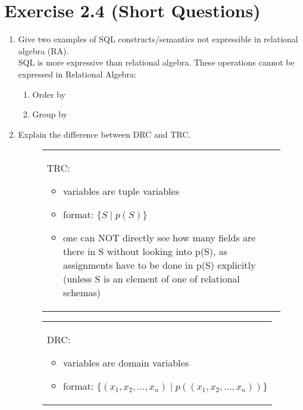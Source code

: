 \documentclass[10pt]{article}
\begin{document}
		\clearpage
		
		\section*{Exercise 2.4 (Short Questions)}
		
		\begin{enumerate}
			\item Give two examples of SQL constructs/semantics not expressible in relational algebra (RA).\\
			SQL is more expressive than relational algebra. These operations cannot be expressed in Relational Algebra:
			\begin{enumerate}
				\item Order by
				\item Group by
			\end{enumerate}
		
			\item Explain the difference between DRC and TRC.
			
			\begin{figure}[!htb]
				\centering
				\begin{minipage}{0.5\textwidth}
					\begin{tabular}{p{}}
						TRC:
						
						\begin{itemize}
							
							\item variables are tuple variables

							
							\item format: $\{ S \;|\; p(S) \}$
							
							
							\item one can NOT directly see how many fields are there in S without looking into p(S), as assignments have to be done in p(S) explicitly (unless S is an element of one of relational schemas) 
						\end{itemize}
					\end{tabular}
				\end{minipage}%
				\begin{minipage}{0.5\textwidth}
					\begin{tabular}{|p{}}
						DRC:
						
						\begin{itemize}
							\item variables are domain variables
								
							\item format: $\{ (x_{1}, x_{2}, ..., x_{n}) \;|\; p( (x_{1}, x_{2}, ..., x_{n}) ) \}$
							

\end{itemize}
\end{tabular}
\end{minipage}
\end{figure}
\end{enumerate}
\end{document}

